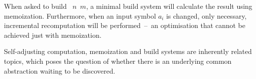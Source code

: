 \noindent
When asked to build ~$n$~$m$, a minimal build system will calculate the
result using memoization. Furthermore, when an input symbol $a_i$ is changed,
only necessary, incremental recomputation will be performed~--~an optimisation
that cannot be achieved just with memoization.

Self-adjusting computation, memoization and build systems are inherently related
topics, which poses the question of whether there is an underlying common
abstraction waiting to be discovered.

